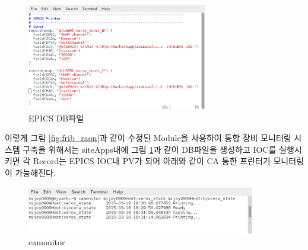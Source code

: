 \documentclass[11pt
  , a4paper
  , article
  , oneside
]{memoir}
\begin{document}
\begin{figure}[h!]
  \centering
  \includegraphics[width=0.7\textwidth]{./images/app.eps}
  \caption{EPICS DB파일}
  \label{fig:db}   
\end{figure}

이렇게 그림 \ref{fig:frib_raon}과 같이 수정된 Module을 사용하여 통합 장비 모니터링 시스템 구축을 위해서는 siteApps내에 그림 \ref{fig:db}과 같이 DB파일을 생성하고 IOC를 실행시키면 각 Record는 EPICS IOC내 PV가 되어 아래와 같이 CA 통한 프린터기 모니터링이 가능해진다. 

\begin{figure}[h!]
  \centering
  	      \includegraphics[width=0.89\textwidth]{./images/printer_camoni.eps}
  \caption{camonitor}
  	      \label{fig:printer_camoni}
\end{figure}

\clearpage
\end{document}
